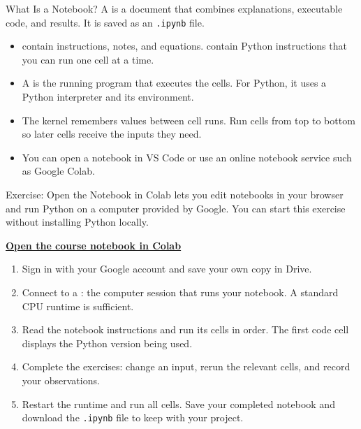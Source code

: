 \begin{frame}{What Is a Notebook?}
A  is a document that combines explanations, executable code, and results. It is saved as an \texttt{.ipynb} file.
\par\medskip
\begin{itemize}
\item {} contain instructions, notes, and equations.  contain Python instructions that you can run one cell at a time.
\item A  is the running program that executes the cells. For Python, it uses a Python interpreter and its environment.
\item The kernel remembers values between cell runs. Run cells from top to bottom so later cells receive the inputs they need.
\item You can open a notebook in VS Code or use an online notebook service such as Google Colab.
\end{itemize}
\end{frame}

\begin{frame}{Exercise: Open the Notebook in Colab}
 lets you edit notebooks in your browser and run Python on a computer provided by Google. You can start this exercise without installing Python locally.
\par\medskip
\href{https://colab.research.google.com/github/YaolangZhong/U_Tokyo_Comp_Econ_Course/blob/main/weeks/week_01/lab/starter/markov_processes.ipynb}{\textbf{Open the course notebook in Colab}}
\par\medskip
\begin{enumerate}
\item Sign in with your Google account and save your own copy in Drive.
\item Connect to a : the computer session that runs your notebook. A standard CPU runtime is sufficient.
\item Read the notebook instructions and run its cells in order. The first code cell displays the Python version being used.
\item Complete the exercises: change an input, rerun the relevant cells, and record your observations.
\item Restart the runtime and run all cells. Save your completed notebook and download the \texttt{.ipynb} file to keep with your project.
\end{enumerate}
\end{frame}

